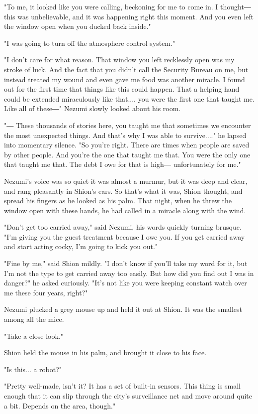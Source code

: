 "To me, it looked like you were calling, beckoning for me to come in. I
thought― this was unbelievable, and it was happening right this moment.
And you even left the window open when you ducked back inside."

"I was going to turn off the atmosphere control system."

"I don't care for what reason. That window you left recklessly open was
my stroke of luck. And the fact that you didn't call the Security Bureau
on me, but instead treated my wound and even gave me food was another
miracle. I found out for the first time that things like this could
happen. That a helping hand could be extended miraculously like that....
you were the first one that taught me. Like all of these―" Nezumi slowly
looked about his room.

"― These thousands of stories here, you taught me that sometimes we
encounter the most unexpected things. And that's why I was able to
survive...." he lapsed into momentary silence. "So you're right. There
are times when people are saved by other people. And you're the one that
taught me that. You were the only one that taught me that. The debt I
owe for that is high― unfortunately for me."

Nezumi's voice was so quiet it was almost a murmur, but it was deep and
clear, and rang pleasantly in Shion's ears. So that's what it was, Shion
thought, and spread his fingers as he looked as his palm. That night,
when he threw the window open with these hands, he had called in a
miracle along with the wind.

"Don't get too carried away," said Nezumi, his words quickly turning
brusque. "I'm giving you the guest treatment because I owe you. If you
get carried away and start acting cocky, I'm going to kick you out."

"Fine by me," said Shion mildly. "I don't know if you'll take my word
for it, but I'm not the type to get carried away too easily. But how did
you find out I was in danger?" he asked curiously. "It's not like you
were keeping constant watch over me these four years, right?"

Nezumi plucked a grey mouse up and held it out at Shion. It was the
smallest among all the mice.

"Take a close look."

Shion held the mouse in his palm, and brought it close to his face.

"Is this... a robot?"

"Pretty well-made, isn't it? It has a set of built-in sensors. This
thing is small enough that it can slip through the city's surveillance
net and move around quite a bit. Depends on the area, though."

